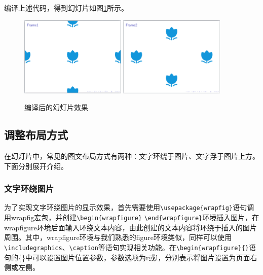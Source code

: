 编译上述代码，得到幻灯片如图\ref{fig:946}所示。

\begin{figure}[htbp]
    \centering
    \includegraphics[width = 0.45\textwidth]{images/ch_9/eg6_6new_1.png}
    \includegraphics[width = 0.45\textwidth]{images/ch_9/eg6_6new_2.png}
    \caption{编译后的幻灯片效果}
    \label{fig:946}
\end{figure}

\subsection{调整布局方式}

在幻灯片中，常见的图文布局方式有两种：文字环绕于图片、文字浮于图片上方。下面分别展开介绍。

\subsubsection{文字环绕图片}

为了实现文字环绕图片的显示效果，首先需要使用\texttt{\textbackslash{}usepackage\{wrapfig\}}语句调用wrapfig宏包，并创建\texttt{\textbackslash{}begin\{wrapfigure\}} \texttt{\textbackslash{}end\{wrapfigure\}}环境插入图片，在wrapfigure环境后面输入环绕文本内容，由此创建的文本内容将环绕于插入的图片周围。其中，wrapfigure环境与我们熟悉的figure环境类似，同样可以使用\texttt{\textbackslash{}includegraphics}、\texttt{\textbackslash{}caption}等语句实现相关功能。在\texttt{\textbackslash{}begin\{wrapfigure\}\{\}}语句的\{\}中可以设置图片位置参数，参数选项为r或l，分别表示将图片设置为页面右侧或左侧。

